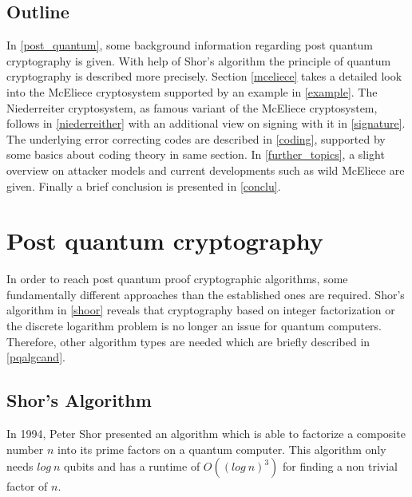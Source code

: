 \subsection*{Outline}
In \autoref{post_quantum}, some background information regarding post quantum cryptography is given. With help of Shor's algorithm the principle of quantum cryptography is described more precisely. Section \ref{mceliece} takes a detailed look into the McEliece cryptosystem supported by an example in \autoref{example}. The Niederreiter cryptosystem, as famous variant of the McEliece cryptosystem, follows in \autoref{niederreither} with an additional view on signing with it in \autoref{signature}. The underlying error correcting codes are described in \autoref{coding}, supported by some basics about coding theory in same section. In \autoref{further_topics}, a slight overview on attacker models and current developments such as wild McEliece are given. Finally a brief conclusion is presented in \autoref{conclu}.




\section{Post quantum cryptography}
\label{post_quantum}
In order to reach post quantum proof cryptographic algorithms, some fundamentally different approaches than the established ones are required. Shor's algorithm in \ref{shoor} reveals that cryptography based on integer factorization or the discrete logarithm problem is no longer an issue for quantum computers. Therefore, other algorithm types are needed which are briefly described in \autoref{pqalgcand}.   

\subsection*{Shor's Algorithm}
\label{shoor}
In 1994, Peter Shor presented an algorithm which is able to factorize a composite number $n$ into its prime factors on a quantum computer. This algorithm only needs $log\: n$ qubits and has a runtime of $O((log\: n)^3)$ for finding a non trivial factor of $n$. 

